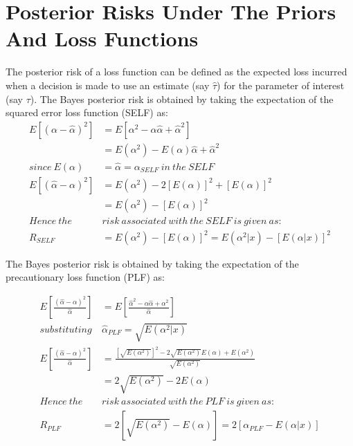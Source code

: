 \documentclass[a4paper,12pt]{report}
\newcommand{\para}{\hspace{0.5cm}}
\begin{document}
\section{Posterior Risks Under The Priors And Loss Functions}
\noindent\para The posterior risk of a loss function can be defined as the expected loss incurred when a decision is made to use an estimate (say $\hat{\tau}$) for the parameter of interest (say $\tau$).
The Bayes posterior risk is obtained by taking the expectation of the squared error loss function (SELF) as:
\begin{equation}\label{prf1}
\begin{split}
E\left[(\alpha-\hat{\alpha})^2\right]&=E\left[\alpha^2-\alpha\hat{\alpha}+\hat{\alpha}^2\right]\\
&=E(\alpha^2)-E(\alpha)\hat{\alpha}+\hat{\alpha}^2\\
since\ E(\alpha)&=\hat{\alpha}=\alpha_{SELF}\ in\ the\ SELF\\
E\left[(\hat{\alpha}-\alpha)^2\right]&=E(\alpha^2)-2\left[E(\alpha)\right]^2+\left[E(\alpha)\right]^2\\
&=E(\alpha^2)-\left[E(\alpha)\right]^2\\
Hence\ the\ &risk\ associated\ with\ the\ SELF\ is\ given\ as:\\
R_{SELF}&=E(\alpha^2)-\left[E(\alpha)\right]^2=E(\alpha^2|x)-\left[E(\alpha|x)\right]^2
\end{split}
\end{equation}

\noindent The Bayes posterior risk is obtained by taking the expectation of the precautionary loss function (PLF) as:

\begin{equation}\label{prf2}
\begin{split}
E\left[\frac{(\hat{\alpha}-\alpha)^2}{\hat{\alpha}}\right]&=E\left[\frac{\hat{\alpha}^2-\alpha\hat{\alpha}+\alpha^2}{\hat{\alpha}}\right]\\
substituting\ &\hat{\alpha}_{PLF} = \sqrt {E\left( {{\alpha^2}|x} \right)}\\
E\left[ {\frac{{{{\left( {{\hat{\alpha}} - \alpha } \right)}^2}}}{{{\hat{\alpha}}}}} \right] &= \frac{{{{\left[ {\sqrt {E\left( {{\alpha ^2}} \right)} } \right]}^2} - 2\sqrt {E\left( {{\alpha ^2}} \right)} E\left( \alpha  \right) + E\left( {{\alpha ^2}} \right)}}{{\sqrt {E\left( {{\alpha ^2}} \right)} }}\\
&= 2\sqrt {E\left( {{\alpha ^2}} \right)}  - 2E\left( \alpha  \right)\\
Hence\ the\ &risk\ associated\ with\ the\ PLF\ is\ given\ as:\\
{R_{PLF}} &= 2\left[ {\sqrt {E\left( {{\alpha ^2}} \right)}  - E\left( \alpha  \right)} \right] = 2\left[ {{\alpha _{PLF}} - E\left( {\alpha |x} \right)} \right]
\end{split}
\end{equation}
\end{document}
